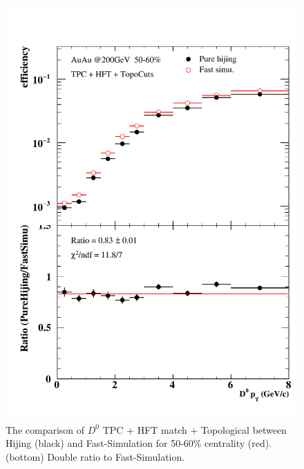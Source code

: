 \begin{figure}[htbp]
\begin{minipage}[htbp]{0.47\linewidth}
\centering
\includegraphics[width=1.0\textwidth,angle=0]{figure/Run14_D0HFT/50_60.pdf}
\caption{ The comparison of $D^0$ TPC + HFT match + Topological between Hijing (black) and Fast-Simulation for 50-60\% centrality (red). (bottom) Double ratio to Fast-Simulation.\label{50_60}}
\end{minipage}
\hfill
\begin{minipage}[htbp]{0.47\linewidth}
\centering

\end{minipage}
\end{figure}
